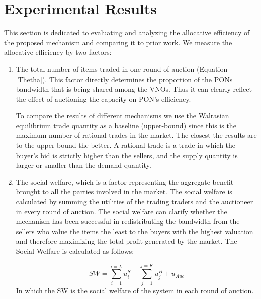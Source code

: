 

\section{Experimental Results} \label{results}
This section is dedicated to evaluating and analyzing the allocative efficiency of the proposed mechanism and comparing it to prior work. We measure the allocative efficiency by two factors:
\begin{enumerate}
\item The total number of items traded in one round of auction (Equation \ref{Thetha}). This factor directly determines the proportion of the \acp{PON} bandwidth that is being shared among the VNOs. Thus it can clearly reflect the effect of auctioning the capacity on PON's efficiency.

To compare the results of different mechanisms we use the Walrasian equilibrium trade quantity as a baseline (upper-bound) since this is the maximum number of rational trades in the market. The closest the results are to the upper-bound the better. A rational trade is a trade in which the buyer's bid is strictly higher than the sellers, and the supply quantity is larger or smaller than the demand quantity.

\item The social welfare, which is a factor representing the aggregate benefit brought to all the parties involved in the market. The social welfare is calculated by summing the utilities of the trading traders and the auctioneer in every round of auction. The social welfare can clarify whether the mechanism has been successful in redistributing the bandwidth from the sellers who value the items the least to the buyers with the highest valuation and therefore maximizing the total profit generated by the market. The Social Welfare is calculated as follows:

\begin{equation}
\label{SW:formula}
SW = \sum_{i=1}^{i=L} u^S_i + \sum_{j=1}^{j=K} u^B_j + u_{Auc}
\end{equation}
In which the SW is the social welfare of the system in each round of auction.
\end{enumerate}


